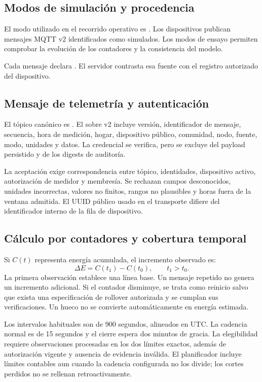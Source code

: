 \subsection{Modos de simulación y procedencia}
El modo utilizado en el recorrido operativo es . Los dispositivos publican mensajes MQTT v2 identificados como simulados. Los modos de ensayo permiten comprobar la evolución de los contadores y la consistencia del modelo.

Cada mensaje declara . El servidor contrasta esa fuente con el registro autorizado del dispositivo.

\subsection{Mensaje de telemetría y autenticación}
El tópico canónico es . El sobre v2 incluye versión, identificador de mensaje, secuencia, hora de medición, hogar, dispositivo público, comunidad, nodo, fuente, modo, unidades y datos. La credencial se verifica, pero se excluye del payload persistido y de los digests de auditoría.

La aceptación exige correspondencia entre tópico, identidades, dispositivo activo, autorización de medidor y membresía. Se rechazan campos desconocidos, unidades incorrectas, valores no finitos, rangos no plausibles y horas fuera de la ventana admitida. El UUID público usado en el transporte difiere del identificador interno de la fila de dispositivo.

\subsection{Cálculo por contadores y cobertura temporal}
Si $C(t)$ representa energía acumulada, el incremento observado es:
\begin{equation}
\Delta E=C(t_1)-C(t_0), \qquad t_1>t_0.
\end{equation}
La primera observación establece una línea base. Un mensaje repetido no genera un incremento adicional. Si el contador disminuye, se trata como reinicio salvo que exista una especificación de rollover autorizada y se cumplan sus verificaciones. Un hueco no se convierte automáticamente en energía estimada.

Los intervalos habituales son de 900 segundos, alineados en UTC. La cadencia normal es de 15 segundos y el cierre espera dos minutos de gracia. La elegibilidad requiere observaciones procesadas en los dos límites exactos, además de autorización vigente y ausencia de evidencia inválida. El planificador incluye límites contables aun cuando la cadencia configurada no los divide; los cortes perdidos no se rellenan retroactivamente.

